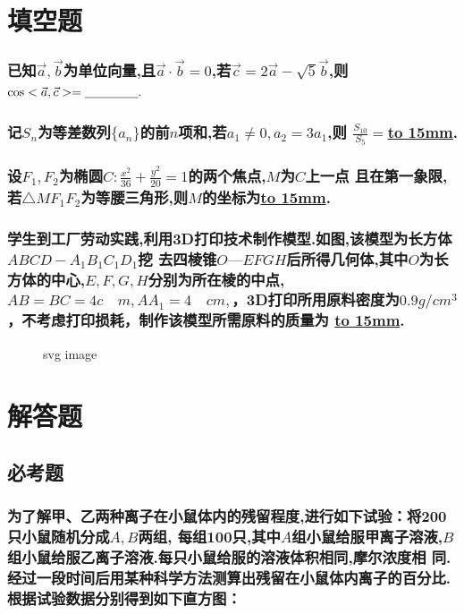 \documentclass[UTF8]{ctexart}
\begin{document}
\section{填空题}
\subsubsection{已知$\vec{a},\vec{b}$为单位向量,且$\vec{a}\cdot
        \vec{b}=0$,若$\vec{c}=2\vec{a}-\sqrt{5}\vec{b}$,则
    $\cos<\vec{a},\vec{c}> =\underline{\hbox to 15mm{}}.$}
\subsubsection{记$S_n$为等差数列$\{a_n\}$的前$n$项和,若$a_1\neq 0,a_2=3a_1$,则
    $\frac{S_{10}}{S_5}=$\underline{\hbox to 15mm{}}.}
\subsubsection{设$F_1,F_2$为椭圆$C:\frac{x^2}{36}+\frac{y^2}{20}=1$的两个焦点,$M$为$C$上一点
    且在第一象限,若$\triangle MF_1F_2$为等腰三角形,则$M$的坐标为\underline{\hbox to 15mm{}}.}
\subsubsection{学生到工厂劳动实践,利用3D打印技术制作模型.如图,该模型为长方体$ABCD-A_1B_1C_1D_1$挖
    去四棱锥$O—EFGH$后所得几何体,其中$O$为长方体的中心,$E,F,G,H$分别为所在棱的中点,$AB=BC=4c\quad m,
        AA_1=4\quad cm,$，3D打印所用原料密度为$0.9 g/cm^3$，不考虑打印损耗，制作该模型所需原料的质量为
    \underline{\hbox to 15mm{}}.}
\begin{figure}[htbp]
    \centering
    
    \caption{svg image}
\end{figure}
\section{解答题}
\subsection{必考题}
\subsubsection{为了解甲、乙两种离子在小鼠体内的残留程度,进行如下试验：将200只小鼠随机分成$A,B$两组,
    每组100只,其中$A$组小鼠给服甲离子溶液,$B$组小鼠给服乙离子溶液.每只小鼠给服的溶液体积相同,摩尔浓度相
    同.经过一段时间后用某种科学方法测算出残留在小鼠体内离子的百分比.根据试验数据分别得到如下直方图：}
\end{document}
